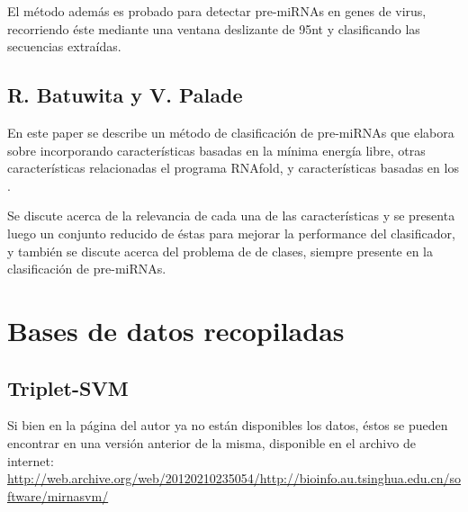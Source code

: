 \documentclass[12pt,bibliography=openstyle,DIV=12,parskip=half-]{scrartcl}
\begin{document}
El método además es probado para detectar pre-miRNAs en genes de
virus, recorriendo éste mediante una ventana deslizante de 95nt y
clasificando las secuencias extraídas.
%
\subsection{R. Batuwita y V. Palade \cite{batuwita}}
%
En este paper se describe un método de clasificación de pre-miRNAs que
elabora sobre \cite{ng} incorporando características basadas en la
mínima energía libre, otras características relacionadas el programa
RNAfold, y características basadas en los .

Se discute acerca de la relevancia de cada una de las características
y se presenta luego un conjunto reducido de éstas para mejorar la
performance del clasificador, y también se discute acerca del problema
de  de clases, siempre presente en la
clasificación de pre-miRNAs.
%
%
%
%
\section{Bases de datos recopiladas}
%
\subsection{Triplet-SVM \cite{xue}}
%
Si bien en la página del autor ya no están disponibles los datos,
éstos se pueden encontrar en una versión anterior de la misma,
disponible en el archivo de internet:
\url{http://web.archive.org/web/20120210235054/http://bioinfo.au.tsinghua.edu.cn/software/mirnasvm/}
\end{document}
